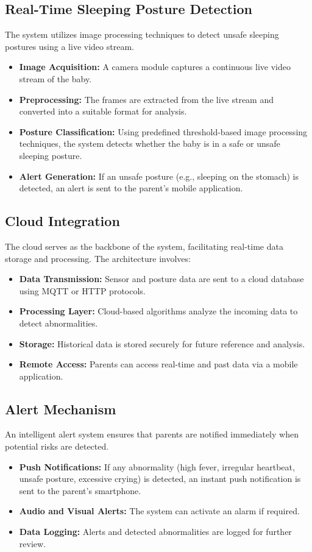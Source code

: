 \documentclass[conference]{IEEEtran}
\begin{document}
\subsection{Real-Time Sleeping Posture Detection}
The system utilizes image processing techniques to detect unsafe sleeping postures using a live video stream. 
\begin{itemize}
    \item \textbf{Image Acquisition:} A camera module captures a continuous live video stream of the baby.
    \item \textbf{Preprocessing:} The frames are extracted from the live stream and converted into a suitable format for analysis.
    \item \textbf{Posture Classification:} Using predefined threshold-based image processing techniques, the system detects whether the baby is in a safe or unsafe sleeping posture.
    \item \textbf{Alert Generation:} If an unsafe posture (e.g., sleeping on the stomach) is detected, an alert is sent to the parent’s mobile application.
\end{itemize}

\subsection{Cloud Integration}
The cloud serves as the backbone of the system, facilitating real-time data storage and processing. The architecture involves:
\begin{itemize}
    \item \textbf{Data Transmission:} Sensor and posture data are sent to a cloud database using MQTT or HTTP protocols.
    \item \textbf{Processing Layer:} Cloud-based algorithms analyze the incoming data to detect abnormalities.
    \item \textbf{Storage:} Historical data is stored securely for future reference and analysis.
    \item \textbf{Remote Access:} Parents can access real-time and past data via a mobile application.
\end{itemize}

\subsection{Alert Mechanism}
An intelligent alert system ensures that parents are notified immediately when potential risks are detected.
\begin{itemize}
    \item \textbf{Push Notifications:} If any abnormality (high fever, irregular heartbeat, unsafe posture, excessive crying) is detected, an instant push notification is sent to the parent’s smartphone.
    \item \textbf{Audio and Visual Alerts:} The system can activate an alarm if required.
    \item \textbf{Data Logging:} Alerts and detected abnormalities are logged for further review.
\end{itemize}
\end{document}
